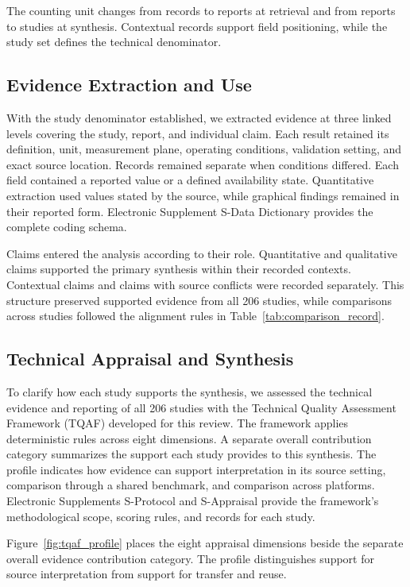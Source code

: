The counting unit changes from records to reports at retrieval and from reports
to studies at synthesis. Contextual records support field positioning, while
the study set defines the technical denominator.

\subsection{Evidence Extraction and Use}

With the study denominator established, we extracted evidence at three linked
levels covering the study, report, and individual claim. Each result retained
its definition, unit, measurement plane, operating conditions, validation
setting, and exact source location. Records remained separate when conditions
differed. Each field contained a reported value or a defined availability
state.
Quantitative extraction used values stated by the source, while graphical
findings remained in their reported form. Electronic Supplement S-Data
Dictionary provides the complete coding schema.

Claims entered the analysis according to their role. Quantitative and
qualitative claims supported the primary synthesis within their recorded
contexts. Contextual claims and claims with source conflicts were recorded
separately. This structure preserved supported evidence from all 206 studies,
while comparisons across studies followed the alignment rules in
Table~\ref{tab:comparison_record}.

\subsection{Technical Appraisal and Synthesis}

To clarify how each study supports the synthesis, we assessed the technical
evidence and reporting of all 206 studies with the Technical Quality Assessment
Framework (TQAF) developed for this review. The framework applies deterministic
rules across eight dimensions. A separate overall contribution category
summarizes the support each study provides to this synthesis. The profile
indicates how evidence can support interpretation in its source setting,
comparison through a shared benchmark, and comparison across platforms.
Electronic Supplements S-Protocol and S-Appraisal provide the framework's
methodological scope, scoring rules, and records for each study.

Figure~\ref{fig:tqaf_profile} places the eight appraisal dimensions beside the
separate overall evidence contribution category. The profile distinguishes
support for source interpretation from support for transfer and reuse.

